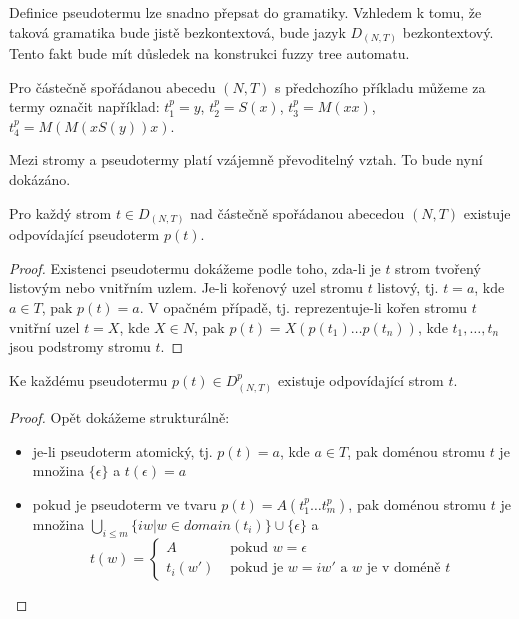 \documentclass[a4paper,10pt]{article}
\begin{document}
\begin{note}
  Definice pseudotermu lze snadno přepsat do gramatiky. Vzhledem k tomu, že taková gramatika bude jistě bezkontextová, bude jazyk $D_{(N, T)}$ bezkontextový. Tento fakt bude mít důsledek na konstrukci fuzzy tree automatu.
\end{note}

\begin{example} \label{ex:PseTerms}
 Pro částečně spořádanou abecedu $(N, T)$ s předchozího příkladu můžeme za termy označit například: $t^p_1 = y$, $t^p_2 = S(x)$, $t^p_3 = M(x x)$, $t^p_4 = M(M(x S(y)) x)$.
\end{example}

Mezi stromy a pseudotermy platí vzájemně převoditelný vztah. To bude nyní dokázáno.

\begin{theorem}
 Pro každý strom $t \in D_{(N,T)}$ nad částečně spořádanou abecedou $(N, T)$ existuje odpovídající pseudoterm $p(t)$.
\end{theorem}
\begin{proof}
 Existenci pseudotermu dokážeme podle toho, zda-li je $t$ strom tvořený listovým nebo vnitřním uzlem. Je-li kořenový uzel stromu $t$ listový, tj. $t = a$, kde $a \in T$, pak $p(t) = a$. V opačném případě, tj. reprezentuje-li kořen stromu $t$ vnitřní uzel $t = X$, kde $X \in N$, pak $p(t) = X(p(t_1) \dots p(t_n))$, kde $t_1, \dots, t_n$ jsou podstromy stromu $t$.
\end{proof}

\begin{theorem}
 Ke každému pseudotermu $p(t) \in D_{(N,T)}^p$ existuje odpovídající strom $t$.
\end{theorem}
\begin{proof}
 Opět dokážeme strukturálně:
 \begin{itemize}
  \item je-li pseudoterm atomický, tj. $p(t) = a$, kde $a \in T$, pak doménou stromu $t$ je množina $\{ \epsilon \}$ a $t(\epsilon) = a$
  \item pokud je pseudoterm ve tvaru $p(t) = A(t_1^p \dots t_m^p)$, pak doménou stromu $t$ je množina $\bigcup_{i \leq m} \{ i w | w \in domain(t_i) \} \cup \{ \epsilon \}$ a 
  $$
   t(w) = 
   \begin{cases}
    A		& \text{ pokud $w = \epsilon$}	\\
    t_i(w')	& \text{ pokud je $w = i w'$ a $w$ je v doméně $t$}
   \end{cases}
  $$
 \end{itemize}
\end{proof}
\end{document}
